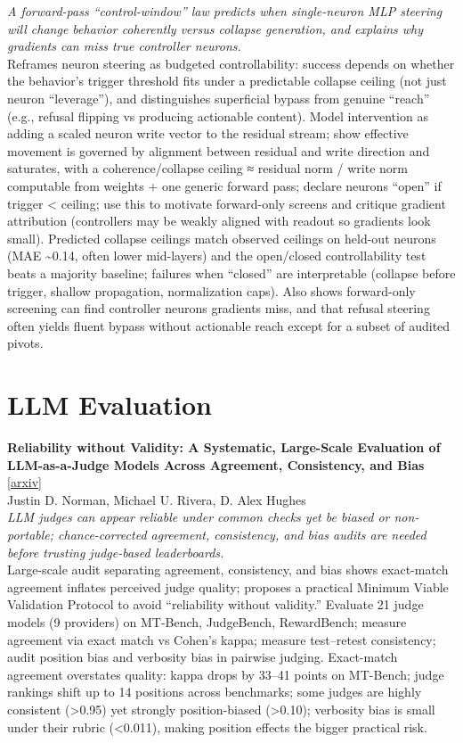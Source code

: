 \documentclass[12pt,letterpaper]{article}
\begin{document}
{\small\textit{A forward-pass ``control-window'' law predicts when single-neuron MLP steering will change behavior coherently versus collapse generation, and explains why gradients can miss true controller neurons.}}\\[1pt]
{\footnotesize Reframes neuron steering as budgeted controllability: success depends on whether the behavior's trigger threshold fits under a predictable collapse ceiling (not just neuron ``leverage''), and distinguishes superficial bypass from genuine ``reach'' (e.g., refusal flipping vs producing actionable content). Model intervention as adding a scaled neuron write vector to the residual stream; show effective movement is governed by alignment between residual and write direction and saturates, with a coherence/collapse ceiling ≈ residual norm / write norm computable from weights + one generic forward pass; declare neurons ``open'' if trigger < ceiling; use this to motivate forward-only screens and critique gradient attribution (controllers may be weakly aligned with readout so gradients look small). Predicted collapse ceilings match observed ceilings on held-out neurons (MAE \textasciitilde{}0.14, often lower mid-layers) and the open/closed controllability test beats a majority baseline; failures when ``closed'' are interpretable (collapse before trigger, shallow propagation, normalization caps). Also shows forward-only screening can find controller neurons gradients miss, and that refusal steering often yields fluent bypass without actionable reach except for a subset of audited pivots.}

\medskip


\section*{LLM Evaluation}

{\small\textbf{Reliability without Validity: A Systematic, Large-Scale Evaluation of LLM-as-a-Judge Models Across Agreement, Consistency, and Bias}} {\scriptsize[\href{https://arxiv.org/abs/2606.19544}{arxiv}]}\\
{\scriptsize Justin D. Norman, Michael U. Rivera, D. Alex Hughes}\\

{\small\textit{LLM judges can appear reliable under common checks yet be biased or non-portable; chance-corrected agreement, consistency, and bias audits are needed before trusting judge-based leaderboards.}}\\[1pt]
{\footnotesize Large-scale audit separating agreement, consistency, and bias shows exact-match agreement inflates perceived judge quality; proposes a practical Minimum Viable Validation Protocol to avoid ``reliability without validity.'' Evaluate 21 judge models (9 providers) on MT-Bench, JudgeBench, RewardBench; measure agreement via exact match vs Cohen's kappa; measure test--retest consistency; audit position bias and verbosity bias in pairwise judging. Exact-match agreement overstates quality: kappa drops by 33--41 points on MT-Bench; judge rankings shift up to 14 positions across benchmarks; some judges are highly consistent (>0.95) yet strongly position-biased (>0.10); verbosity bias is small under their rubric (<0.011), making position effects the bigger practical risk.}
\end{document}
